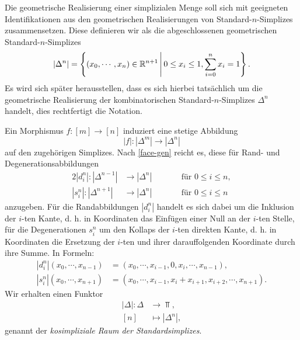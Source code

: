 Die geometrische Realisierung einer simplizialen Menge soll sich mit
geeigneten Identifikationen aus den geometrischen Realisierungen von
Standard-$n$-Simplizes zusammensetzen. Diese definieren wir als die
abgeschlossenen geometrischen Standard-$n$-Simplizes
\[ |\Delta^n| = \left\{ (x_0, \cdots, x_n) \in \mathbb{R}^{n+1} \,\middle|\, 0 \leq x_i \leq 1, \sum_{i=0}^n x_i = 1 \right\}. \]
Es wird sich später herausstellen, dass es sich hierbei tatsächlich um
die geometrische Realisierung der kombinatorischen
Standard-$n$-Simplizes $\Delta^n$ handelt, dies rechtfertigt die
Notation.

Ein Morphismus $f: [m] \to [n]$ induziert eine stetige Abbildung
\[ |f|: |\Delta^m| \to |\Delta^n| \]
auf den zugehörigen Simplizes. Nach \ref{face-gen} reicht es, diese
für Rand- und Degenerationsabbildungen
\begin{alignat*}{2}
  |d_i^n|: |\Delta^{n-1}| &\to |\Delta^n| \qquad && \text{für } 0 \leq i \leq n, \\
  |s_i^n|: |\Delta^{n+1}| &\to |\Delta^n| && \text{für } 0 \leq i \leq n
\end{alignat*}
anzugeben. Für die Randabbildungen $|d_i^n|$ handelt es sich dabei um
die Inklusion der $i$-ten Kante, d. h. in Koordinaten das Einfügen
einer Null an der $i$-ten Stelle, für die Degenerationen $s_i^n$ um
den Kollaps der $i$-ten direkten Kante, d. h. in Koordinaten die
Ersetzung der $i$-ten und ihrer darauffolgenden Koordinate durch ihre
Summe. In Formeln:
\begin{align} \label{eq:cosimp-space}
  |d_i^n|(x_0, \cdots, x_{n-1})
  &= (x_0, \cdots, x_{i-1}, 0, x_i, \cdots, x_{n-1}), \\
  |s_i^n|(x_0, \cdots, x_{n+1})
  &= (x_0, \cdots, x_{i-1}, x_i + x_{i+1}, x_{i+2}, \cdots, x_{n+1}).
\end{align}
Wir erhalten einen Funktor
\begin{align*}
  |\Delta|: \Delta &\to \Top, \\
  [n] &\mapsto |\Delta^n|,
\end{align*}
genannt der \emph{kosimpliziale Raum der Standardsimplizes}.

